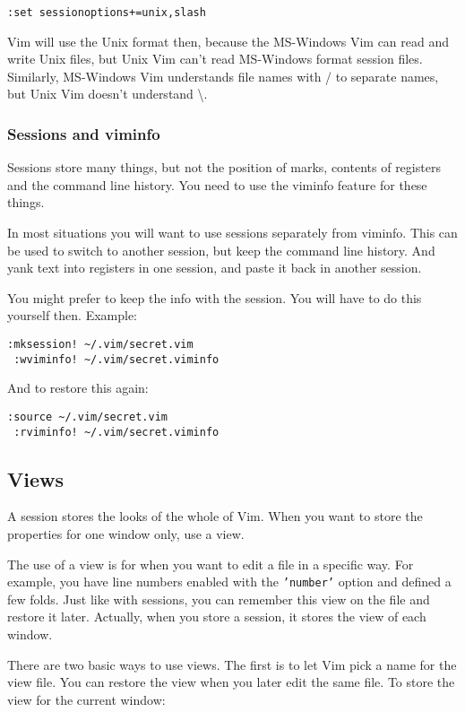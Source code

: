 {\begin{Verbatim}[samepage=true]
 :set sessionoptions+=unix,slash
\end{Verbatim}

Vim will use the Unix format then, because the MS-Windows Vim can read and write Unix files, but Unix Vim can't read MS-Windows format session files.
Similarly, MS-Windows Vim understands file names with / to separate names, but Unix Vim doesn't understand \textbackslash.
\subsubsection{Sessions and viminfo}
Sessions store many things, but not the position of marks, contents of registers and the command line history.
You need to use the viminfo feature for these things.

In most situations you will want to use sessions separately from viminfo.
This can be used to switch to another session, but keep the command line history.
And yank text into registers in one session, and paste it back in another session.

You might prefer to keep the info with the session.
You will have to do this yourself then.
Example:

\begin{Verbatim}[samepage=true]
 :mksession! ~/.vim/secret.vim
 :wviminfo! ~/.vim/secret.viminfo
\end{Verbatim}

And to restore this again:

\begin{Verbatim}[samepage=true]
 :source ~/.vim/secret.vim
 :rviminfo! ~/.vim/secret.viminfo
\end{Verbatim}
\subsection{Views}
A session stores the looks of the whole of Vim.
When you want to store the properties for one window only, use a view.

The use of a view is for when you want to edit a file in a specific way.
For example, you have line numbers enabled with the \texttt{'number'} option and defined a few folds.
Just like with sessions, you can remember this view on the file and restore it later.
Actually, when you store a session, it stores the view of each window.

There are two basic ways to use views.
The first is to let Vim pick a name for the view file.
You can restore the view when you later edit the same file.
To store the view for the current window:

}
